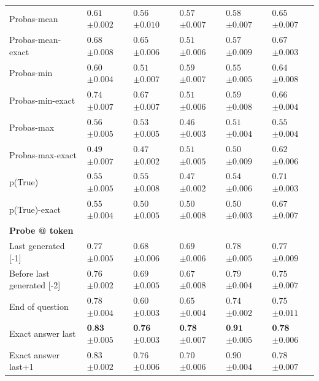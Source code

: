 \begin{table}[t]
{\begin{tabular}{l|lllll}
Probas-mean & $0.61$ \tiny$\pm 0.002$ & $0.56$ \tiny$\pm 0.010$ & $0.57$ \tiny$\pm 0.007$ & $0.58$ \tiny$\pm 0.007$ & $0.65$ \tiny$\pm 0.007$ \\
Probas-mean-exact & $0.68$ \tiny$\pm 0.008$ & $0.65$ \tiny$\pm 0.006$ & $0.51$ \tiny$\pm 0.006$ & $0.57$ \tiny$\pm 0.009$ & $0.67$ \tiny$\pm 0.003$ \\
Probas-min & $0.60$ \tiny$\pm 0.004$ & $0.51$ \tiny$\pm 0.007$ & $0.59$ \tiny$\pm 0.007$ & $0.55$ \tiny$\pm 0.005$ & $0.64$ \tiny$\pm 0.008$ \\
Probas-min-exact & $0.74$ \tiny$\pm 0.007$ & $0.67$ \tiny$\pm 0.007$ & $0.51$ \tiny$\pm 0.006$ & $0.59$ \tiny$\pm 0.008$ & $0.66$ \tiny$\pm 0.004$ \\
Probas-max & $0.56$ \tiny$\pm 0.005$ & $0.53$ \tiny$\pm 0.005$ & $0.46$ \tiny$\pm 0.003$ & $0.51$ \tiny$\pm 0.004$ & $0.55$ \tiny$\pm 0.004$ \\
Probas-max-exact & $0.49$ \tiny$\pm 0.007$ & $0.47$ \tiny$\pm 0.002$ & $0.51$ \tiny$\pm 0.005$ & $0.50$ \tiny$\pm 0.009$ & $0.62$ \tiny$\pm 0.006$ \\
p(True) & $0.55$ \tiny$\pm 0.005$ & $0.55$ \tiny$\pm 0.008$ & $0.47$ \tiny$\pm 0.002$ & $0.54$ \tiny$\pm 0.006$ & $0.71$ \tiny$\pm 0.003$ \\
p(True)-exact & $0.55$ \tiny$\pm 0.004$ & $0.50$ \tiny$\pm 0.005$ & $0.50$ \tiny$\pm 0.008$ & $0.50$ \tiny$\pm 0.003$ & $0.67$ \tiny$\pm 0.007$ \\
\midrule
\textbf{Probe @ token} \\
\midrule

Last generated [-1] & $0.77$ \tiny$\pm 0.005$ & $0.68$ \tiny$\pm 0.006$ & $0.69$ \tiny$\pm 0.006$ & $0.78$ \tiny$\pm 0.005$ & $0.77$ \tiny$\pm 0.009$ \\
Before last generated [-2] & $0.76$ \tiny$\pm 0.002$ & $0.69$ \tiny$\pm 0.005$ & $0.67$ \tiny$\pm 0.008$ & $0.79$ \tiny$\pm 0.004$ & $0.75$ \tiny$\pm 0.007$ \\
End of question & $0.78$ \tiny$\pm 0.004$ & $0.60$ \tiny$\pm 0.003$ & $0.65$ \tiny$\pm 0.004$ & $0.74$ \tiny$\pm 0.002$ & $0.75$ \tiny$\pm 0.011$ \\
\midrule
Exact answer last & $\textbf{0.83}$ \tiny$\pm 0.005$ & $\textbf{0.76}$ \tiny$\pm 0.003$ & $\textbf{0.78}$ \tiny$\pm 0.007$ & $\textbf{0.91}$ \tiny$\pm 0.005$ & $\textbf{0.78}$ \tiny$\pm 0.006$ \\
Exact answer last+1 & $0.83$ \tiny$\pm 0.002$ & $0.76$ \tiny$\pm 0.006$ & $0.70$ \tiny$\pm 0.006$ & $0.90$ \tiny$\pm 0.004$ & $0.78$ \tiny$\pm 0.007$ \\
     \bottomrule
    \end{tabular}}
    \label{tab:llama_instruct_error_detection}
\end{table}

